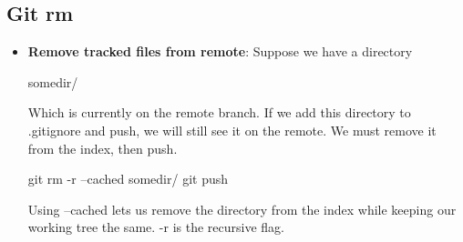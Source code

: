 \documentclass{report}
\begin{document}
    \subsection{Git rm}
    \begin{itemize}
        \item \textbf{Remove tracked files from remote}: Suppose we have a directory
            \bigbreak \noindent 
            \begin{bashcode}
            somedir/
            \end{bashcode}
            \bigbreak \noindent 
            Which is currently on the remote branch. If we add this directory to .gitignore and push, we will still see it on the remote. We must remove it from the index, then push.
            \bigbreak \noindent 
            \begin{bashcode}
            git rm -r --cached somedir/
            git push
            \end{bashcode}
            \bigbreak \noindent 
            Using --cached lets us remove the directory from the index while keeping our working tree the same. -r is the recursive flag.
    \end{itemize}






    
\end{document}
